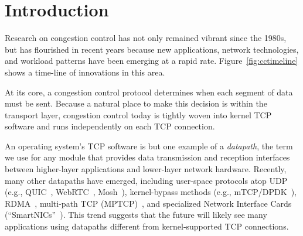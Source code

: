 \section{Introduction}

Research on congestion control has not only remained vibrant since the 1980s, but has flourished in recent years because new applications, network technologies, and workload patterns have been emerging at a rapid rate. Figure~\ref{fig:cctimeline} shows a time-line of innovations in this area.

At its core, a congestion control protocol determines when each segment of data must be sent. Because a natural place to make this decision is within the transport layer, congestion control today is tightly woven into kernel TCP software and runs independently on each TCP connection.


An operating system's TCP software is but one example of a {\em datapath}, the term we use for any module that provides data transmission and reception interfaces between higher-layer applications and lower-layer network hardware. Recently, many other datapaths have emerged, including user-space protocols atop UDP (e.g., QUIC~\cite{quic}, WebRTC~\cite{webrtc}, Mosh~\cite{mosh}), kernel-bypass methods (e.g., mTCP/DPDK~\cite{dpdk,mtcp,netmap}), RDMA~\cite{dcqcn}, multi-path TCP (MPTCP)~\cite{mptcp}, and specialized Network Interface Cards (``SmartNICs''~\cite{smartnic}). This trend suggests that the future will likely see many applications using datapaths different from kernel-supported TCP connections.

